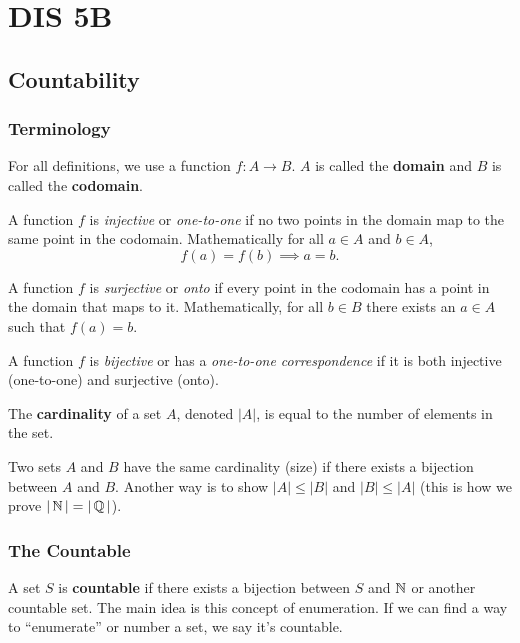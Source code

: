 \section{DIS 5B}

\subsection{Countability}

\subsubsection{Terminology}
For all definitions, we use a function $f: A \to B$. $A$ is called the \textbf{domain} and $B$ is called the \textbf{codomain}. 
\begin{definition}
    A function $f$ is \textit{injective} or \textit{one-to-one} if no two points in the domain map to the same point in the codomain. Mathematically for all $a \in A$ and $b \in A$, \[ f(a) = f(b) \implies a = b. \] 
\end{definition}
\begin{definition}
    A function $f$ is \textit{surjective} or \textit{onto} if every point in the codomain has a point in the domain that maps to it. Mathematically, for all $b \in B$ there exists an $a \in A$ such that $f(a) = b$. 
\end{definition}
\begin{definition}
    A function $f$ is \textit{bijective} or has a \textit{one-to-one correspondence} if it is both injective (one-to-one) and surjective (onto). 
\end{definition}

\begin{definition}[Cardinality]
    The \textbf{cardinality} of a set $A$, denoted $|A|$, is equal to the number of elements in the set. 
\end{definition}
Two sets $A$ and $B$ have the same cardinality (size) if there exists a bijection between $A$ and $B$. Another way is to show $|A| \le |B|$ and $|B| \le |A|$ (this is how we prove $|\operatorname{\mathbb{N}}| = |\operatorname{\mathbb{Q}}|$). 

\subsubsection{The Countable}
A set $S$ is \textbf{countable} if there exists a bijection between $S$ and $\operatorname{\mathbb{N}}$ or another countable set. The main idea is this concept of enumeration. If we can find a way to ``enumerate'' or number a set, we say it's countable. 


